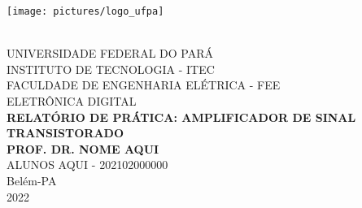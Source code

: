 \thispagestyle{empty}
\begin{center}
    \parbox{3cm}{\texttt{[image: pictures/logo\_ufpa]}}\\
    \vspace{1cm}
    \Large \uppercase{Universidade Federal do Pará}\\
    \Large \uppercase{Instituto de Tecnologia - ITEC}\\
    \vspace{3cm}
    \Large \uppercase{Faculdade de Engenharia Elétrica - FEE}\\
    \Large \uppercase{Eletrônica Digital}\\
    \vspace{3cm}
    \Large \textbf{\uppercase {Relatório de Prática: Amplificador de Sinal Transistorado}} \\
    \Large \textbf{\uppercase {PROF. DR. nome aqui}} \\
    \vspace{3.0cm}
    \Large \uppercase {Alunos aqui - 202102000000}\\

    \vspace{3.5cm}
    \Large {Belém-PA \\ 2022}

\end{center}
